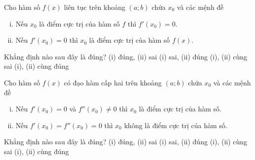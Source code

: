 \begin{ex}%
	Cho hàm số $f(x)$ liên tục trên khoảng $(a;b)$ chứa $x_0$ và các mệnh đề
	\begin{enumerate}[(i)]
		\item Nếu $x_0$ là điểm cực trị của hàm số $f$ thì $f'(x_0)=0$.
		\item Nếu $f'(x_0)=0$ thì $x_0$ là điểm cực trị của hàm số $f(x)$.
	\end{enumerate}
	Khẳng định nào sau đây là đúng?
	\choice
	{(i) đúng, (ii) sai}
	{(i) sai, (ii) đúng}
	{\True (i), (ii) cùng sai}
	{(i), (ii) cùng đúng}
\end{ex}

\begin{ex}%
	Cho hàm số $f(x)$ có đạo hàm cấp hai trên khoảng $(a;b)$ chứa $x_0$ và các mệnh đề
	\begin{enumerate}[(i)]
		\item Nếu $f'(x_0)=0$ và $f''(x_0)\ne 0$ thì $x_0$ là điểm cực trị của hàm số.
		\item Nếu $f'(x_0)=f''(x_0)=0$ thì $x_0$ không là điểm cực trị của hàm số.
	\end{enumerate}
	Khẳng định nào sau đây là đúng?
	\choice
	{\True (i) đúng, (ii) sai}
	{(i) sai, (ii) đúng}
	{(i), (ii) cùng sai}
	{(i), (ii) cùng đúng}
\end{ex}

